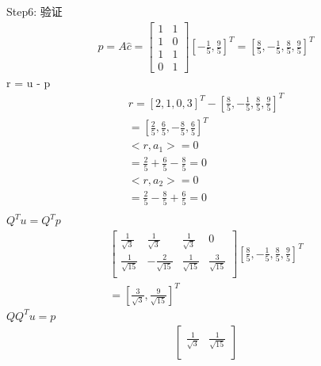\documentclass[12pt]{article}
\begin{document}
\begin{flushleft}
    Step6: 验证 \\
    \begin{align}
        p = A\hat{c} =  \begin{bmatrix}
                            1 & 1 \\
                            1 & 0 \\
                            1 & 1 \\
                            0 & 1
                        \end{bmatrix}[-\frac{1}{5}, \frac{9}{5}]^{T} = [\frac{8}{5}, -\frac{1}{5}, \frac{8}{5}, \frac{9}{5}]^{T}
    \end{align}
    r = u - p \\
    \begin{align}
        r =  [2, 1, 0, 3]^{T} -[\frac{8}{5}, -\frac{1}{5}, \frac{8}{5}, \frac{9}{5}]^{T} \\
        = [\frac{2}{5}, \frac{6}{5}, -\frac{8}{5}, \frac{6}{5}]^{T}                      \\
        <r,a_{1}> = 0                                                                    \\
        = \frac{2}{5} +  \frac{6}{5} - \frac{8}{5} = 0                                   \\
        <r,a_{2}> = 0                                                                    \\
        = \frac{2}{5} -  \frac{8}{5}  +  \frac{6}{5} = 0                                 \\
    \end{align}
    $Q^{T}u = Q^{T}p$ \\
    \begin{align}
        \begin{bmatrix}
            \frac{1}{\sqrt{3}}  & \frac{1}{\sqrt{3}}   & \frac{1}{\sqrt{3}}  & 0                   \\
            \frac{1}{\sqrt{15}} & -\frac{2}{\sqrt{15}} & \frac{1}{\sqrt{15}} & \frac{3}{\sqrt{15}} \\
        \end{bmatrix} [\frac{8}{5}, -\frac{1}{5}, \frac{8}{5}, \frac{9}{5}]^{T} \\
        = [\frac{3}{\sqrt{3}}, \frac{9}{\sqrt{15}}]^{T}
    \end{align}
    $QQ^{T}u = p$ \\
    \begin{align}
        \begin{bmatrix}
            \frac{1}{\sqrt{3}} & \frac{1}{\sqrt{15}}  \\

\end{bmatrix}
\end{align}
\end{flushleft}
\end{document}

